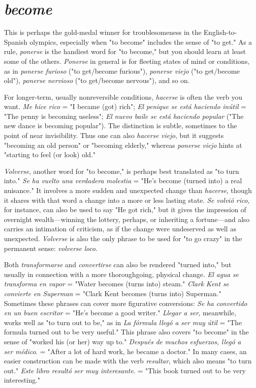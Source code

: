 \section{\emph{become}}

This is perhaps the gold-medal winner for troublesomeness
in the English-to-Spanish olympics, especially when "to become" includes the sense of "to get." As a rule, \emph{ponerse} is the handiest word for
"to become," but you should learn at least some of the others. \emph{Ponerse}
in general is for fleeting states of mind or conditions, as in \emph{ponerse furioso} ("to get/become furious"), \emph{ponerse viejo} ("to get/become old"),
\emph{ponerse nervioso} ("to get/become nervous"), and so on.

For longer-term, usually nonreversible conditions, \emph{hacerse} is
often the verb you want. \emph{Me hice rico} = "I became (got) rich"; \emph{El penique se está haciendo inútil} = "The penny is becoming useless"; \emph{El
nuevo baile se está haciendo popular} ("The new dance is becoming
popular"). The distinction is subtle, sometimes to the point of near
invisibility. Thus one can also \emph{hacerse viejo}, but it suggests "becoming
an old person" or "becoming elderly," whereas \emph{ponerse viejo} hints at
"starting to feel (or look) old."

\emph{Volverse}, another word for "to become," is perhaps best translated as "to turn into." \emph{Se ha vuelto una verdadera molestia} = "He's
become (turned into) a real nuisance." It involves a more sudden and
unexpected change than \emph{hacerse}, though it shares with that word a
change into a more or less lasting state. \emph{Se volvió rico}, for instance,
can also be used to say "He got rich," but it gives the impression of
overnight wealth---winning the lottery, perhaps, or inheriting a fortune---and also carries an intimation of criticism, as if the change were
undeserved as well as unexpected. \emph{Volverse} is also the only phrase to
be used for "to go crazy" in the permanent sense: \emph{volverse loco}.

Both \emph{transformarse} and \emph{convertirse} can also be rendered
"turned into," but usually in connection with a more thoroughgoing,
physical change. \emph{El agua se transforma en vapor} = "Water becomes
(turns into) steam." \emph{Clark Kent se convierte en Superman} = "Clark
Kent becomes (turns into) Superman." Sometimes these phrases can
cover more figurative conversions: \emph{Se ha convertido en un buen escritor} = "He's become a good writer." \emph{Llegar a ser}, meanwhile, works
well as "to turn out to be," as in \emph{La fórmula llegó a ser muy útil} =
"The formula turned out to be very useful." This phrase also covers
"to become" in the sense of "worked his (or her) way up to." \emph{Después
de muchos esfuerzos, llegó a ser médico}. = "After a lot of hard work,
he became a doctor." In many cases, an easier construction can be
made with the verb \emph{resultar}, which also means "to turn out." \emph{Este libro resultó ser muy interesante}. = "This book turned out to be very
interesting."

